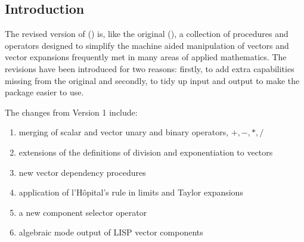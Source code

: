 
\subsection{Introduction}
The revised version of  (\cite{Eastwood:91}) is, like the
original (\cite{Eastwood:87}), a collection of \REDUCE procedures and
operators designed to simplify the machine aided manipulation of vectors
and vector expansions frequently met in many areas of applied mathematics.
The revisions have been introduced for two reasons: firstly, to add extra
capabilities missing from the original and secondly, to tidy up input and
output to make the package easier to use.

The changes from Version 1 include:
\begin{enumerate}
\item merging of scalar and vector unary and binary operators, $+, - , *, /
$
\item extensions of the definitions of division and exponentiation
to vectors
\item new vector dependency procedures
\item application of l'H\^opital's rule in limits and Taylor expansions
\item a new component selector operator
\item algebraic mode output of LISP vector components
\end{enumerate}

